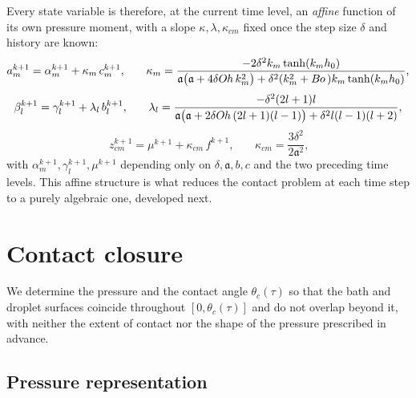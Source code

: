 Every state variable is therefore, at the current time level, an \emph{affine} function of its own pressure moment, with a slope $\kappa,\lambda,\kappa_{cm}$ fixed once the step size $\delta$ and history are known:
\begin{equation}
    a_m^{k+1} = \alpha_m^{k+1} + \kappa_m\, c_m^{k+1}\text{,}\qquad
    \kappa_m = \frac{-2\delta^2 k_m\tanh(k_mh_0)}{\mathfrak a\big(\mathfrak a+4\delta O\kern-0.04em h\, k_m^2\big)+\delta^2(k_m^2+B\kern-0.04em o\,)k_m\tanh(k_mh_0)}\text{,}
    \label{eq:kappa-m}
\end{equation}
\begin{equation}
    \beta_l^{k+1} = \gamma_l^{k+1} + \lambda_l\, b_l^{k+1}\text{,}\qquad
    \lambda_l = \frac{-\delta^2(2l+1)l}{\mathfrak a\big(\mathfrak a+2\delta O\kern-0.04em h\,(2l+1)(l-1)\big)+\delta^2l(l-1)(l+2)}\text{,}
    \label{eq:lambda-l}
\end{equation}
\begin{equation}
    z_{cm}^{k+1} = \mu^{k+1}+\kappa_{cm}\,f^{k+1}\text{,}\qquad \kappa_{cm}=\frac{3\delta^2}{2\mathfrak a^2}\text{,}
    \label{eq:kappa-cm}
\end{equation}
with $\alpha_m^{k+1},\gamma_l^{k+1},\mu^{k+1}$ depending only on $\delta,\mathfrak a,b,c$ and the two preceding time levels. This affine structure is what reduces the contact problem at each time step to a purely algebraic one, developed next.

\section{Contact closure}
\label{sec:contact}

We determine the pressure and the contact angle $\theta_c(\tau)$ so that the bath and droplet surfaces coincide throughout $[0,\theta_c(\tau)]$ and do not overlap beyond it, with neither the extent of contact nor the shape of the pressure prescribed in advance.

\subsection{Pressure representation}
\label{subsec:pressure-representation}

